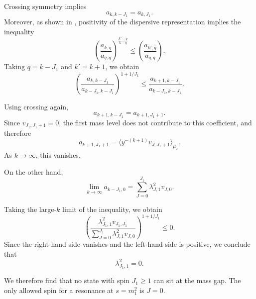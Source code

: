 Crossing symmetry implies
\begin{equation}
    a_{k,k-J_1} = a_{k,J_1}.
\end{equation}
Moreover, as shown in \autocite{Berman:2024kdh}, positivity of the dispersive representation implies the inequality 
\begin{equation}
    \left( \frac{a_{k,q}}{a_{q,q}} \right)^{\frac{k'-q}{k-q}}
    \leq
    \left( \frac{a_{k',q}}{a_{q,q}} \right).
\end{equation}
Taking $q = k - J_1$ and $k' = k+1$, we obtain
\begin{equation}
    \left( 
    \frac{a_{k,k-J_1}}{a_{k-J_1,k-J_1}} 
    \right)^{1 + 1/J_1}
    \leq
    \frac{a_{k+1,k-J_1}}{a_{k-J_1,k-J_1}}.
\end{equation}

Using crossing again,
\begin{equation}
    a_{k+1,k-J_1} = a_{k+1,J_1+1}.
\end{equation}
Since $v_{J_1,J_1+1}=0$, the first mass level does not contribute to this coefficient, and therefore
\begin{equation}
    a_{k+1,J_1+1}
    =
    \langle y^{-(k+1)} v_{J,J_1+1} \rangle_{\mu_2}.
\end{equation}
As $k \to \infty$, this vanishes.

On the other hand,
\begin{equation}
    \lim_{k \to \infty} a_{k-J_1,0}
    =
    \sum_{J=0}^{J_1} 
    \lambda_{J,1}^2 v_{J,0}.
\end{equation}

Taking the large-$k$ limit of the inequality, we obtain
\begin{equation}
    \left(
    \frac{\lambda_{J_1,1}^2 v_{J_1,J_1}}
    {\sum_{J=0}^{J_1} \lambda_{J,1}^2 v_{J,0}}
    \right)^{1 + 1/J_1}
    \leq 0.
\end{equation}
Since the right-hand side vanishes and the left-hand side is positive, we conclude that
\begin{equation}
    \lambda_{J_1,1}^2 = 0.
\end{equation}

We therefore find that no state with spin $J_1 \geq 1$ can sit at the mass gap. The only allowed spin for a resonance at $s = m_1^2$ is $J = 0$.

